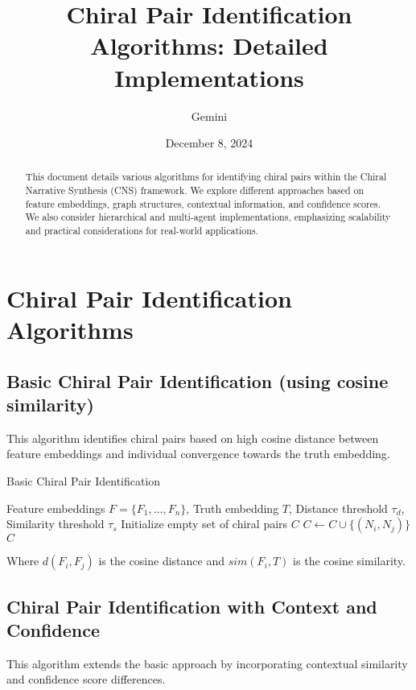 \documentclass{article}
\title{Chiral Pair Identification Algorithms: Detailed Implementations}
\author{Gemini}
\date{December 8, 2024}
\begin{document}
\maketitle

\begin{abstract}
This document details various algorithms for identifying chiral pairs within the Chiral Narrative Synthesis (CNS) framework. We explore different approaches based on feature embeddings, graph structures, contextual information, and confidence scores.  We also consider hierarchical and multi-agent implementations, emphasizing scalability and practical considerations for real-world applications.
\end{abstract}

\section{Chiral Pair Identification Algorithms}

\subsection{Basic Chiral Pair Identification (using cosine similarity)}

This algorithm identifies chiral pairs based on high cosine distance between feature embeddings and individual convergence towards the truth embedding.

\begin{algorithm}[H]
\caption{Basic Chiral Pair Identification}
\begin{algorithmic}[1]
\Require Feature embeddings $F = \{F_1, \dots, F_n\}$, Truth embedding $T$, Distance threshold $\tau_d$, Similarity threshold $\tau_s$
\State Initialize empty set of chiral pairs $C$
        \State $C \gets C \cup \{(N_i, N_j)\}$
    \EndIf
\EndFor
\Return $C$
\end{algorithmic}
\end{algorithm}

Where \(d(F_i, F_j)\) is the cosine distance and \(sim(F_i, T)\) is the cosine similarity.


\subsection{Chiral Pair Identification with Context and Confidence}

This algorithm extends the basic approach by incorporating contextual similarity and confidence score differences.
\end{document}
